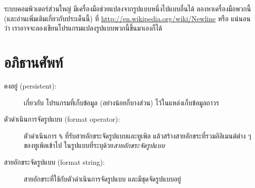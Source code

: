 ระบบคอมพิวเตอร์ส่วนใหญ่
มีเครื่องมือช่วยแปลงจากรูปแบบหนึ่งไปแบบอื่นได้
ลองหาเครื่องมือพวกนี้ (และอ่านเพิ่มเติมเกี่ยวกับประเด็นนี้) ที่ \url{http://en.wikipedia.org/wiki/Newline}  
หรือ แน่นอนว่า เราอาจจะลองเขียนโปรแกรมแปลงรูปแบบพวกนี้ขึ้นมาเองก็ได้


\section{อภิธานศัพท์}

\begin{description}


\item[คงอยู่ (persistent):] เกี่ยวกับ 
โปรแกรมที่เก็บข้อมูล (อย่างน้อยก็บางส่วน) ไว้ในแหล่งเก็บข้อมูลถาวร



\item[ตัวดำเนินการจัดรูปแบบ (format operator):] 
ตัวดำเนินการ \texttt{\%} ที่รับสายอักขระจัดรูปแบบและทูเพิล
แล้วสร้างสายอักขระที่รวมอิลิเมนต์ต่าง ๆ ของทูเพิลเข้าไป ในรูปแบบที่ระบุด้วย\textit{สายอักขระจัดรูปแบบ}


\item[สายอักขระจัดรูปแบบ (format string):] 
สายอักขระที่ใช้กับตัวดำเนินการจัดรูปแบบ และมีชุดจัดรูปแบบอยู่



\end{description}
